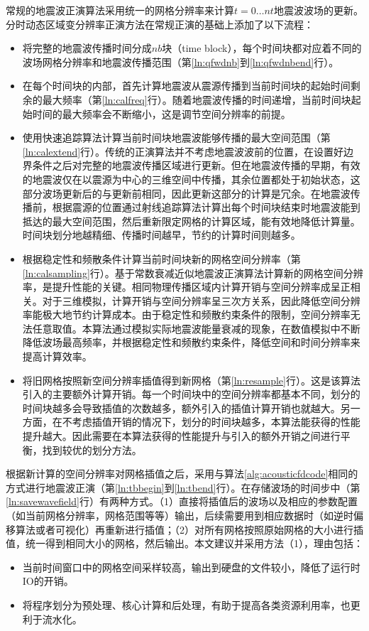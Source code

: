 常规的地震波正演算法采用统一的网格分辨率来计算$t=0\ldots nt$地震波波场的更新。分时动态区域变分辨率正演方法在常规正演的基础上添加了以下流程：
\begin{itemize}
  \item 将完整的地震波传播时间分成$nb$块（time block），每个时间块都对应着不同的波场网格分辨率和地震波传播范围（第\ref{ln:qfwdnb}到\ref{ln:qfwdnbend}行）。
  \item 在每个时间块的内部，首先计算地震波从震源传播到当前时间块的起始时间剩余的最大频率（第\ref{ln:calfreq}行）。随着地震波传播的时间递增，当前时间块起始时间的最大频率会不断缩小，这是调节空间分辨率的前提。
  \item 使用快速追踪算法\cite{um1987fast}计算当前时间块地震波能够传播的最大空间范围（第\ref{ln:calextend}行）。传统的正演算法并不考虑地震波波前的位置，在设置好边界条件之后对完整的地震波传播区域进行更新。但在地震波传播的早期，有效的地震波仅在以震源为中心的三维空间中传播，其余位置都处于初始状态，这部分波场更新后的与更新前相同，因此更新这部分的计算是冗余。在地震波传播前，根据震源的位置通过射线追踪算法计算出每个时间块结束时地震波能到抵达的最大空间范围，然后重新限定网格的计算区域，能有效地降低计算量。时间块划分地越精细、传播时间越早，节约的计算时间则越多。
  \item 根据稳定性和频散条件计算当前时间块新的网格空间分辨率（第\ref{ln:calsampling}行）。基于常数衰减近似地震波正演算法计算新的网格空间分辨率，是提升性能的关键。相同物理传播区域内计算开销与空间分辨率成呈正相关。对于三维模拟，计算开销与空间分辨率呈三次方关系，因此降低空间分辨率能极大地节约计算成本。由于稳定性和频散约束条件的限制，空间分辨率无法任意取值。本算法通过模拟实际地震波能量衰减的现象，在数值模拟中不断降低波场最高频率，并根据稳定性和频散约束条件，降低空间和时间分辨率来提高计算效率。
  \item 将旧网格按照新空间分辨率插值得到新网格（第\ref{ln:resample}行）。这是该算法引入的主要额外计算开销。每一个时间块中的空间分辨率都基本不同，划分的时间块越多会导致插值的次数越多，额外引入的插值计算开销也就越大。另一方面，在不考虑插值开销的情况下，划分的时间块越多，本算法能获得的性能提升越大。因此需要在本算法获得的性能提升与引入的额外开销之间进行平衡，找到较优的划分方法。
\end{itemize}

根据新计算的空间分辨率对网格插值之后，采用与算法\ref{alg:acousticfdcode}相同的方式进行地震波正演（第\ref{ln:tbbegin}到\ref{ln:tbend}行）。在存储波场的时间步中（第\ref{ln:savewavefield}行）有两种方式。（1）直接将插值后的波场以及相应的参数配置（如当前网格分辨率，网格范围等等）输出，后续需要用到相应数据时（如逆时偏移算法或者可视化）再重新进行插值；（2）对所有网格按照原始网格的大小进行插值，统一得到相同大小的网格，然后输出。本文建议并采用方法（1），理由包括：
\begin{itemize}
  \item 当前时间窗口中的网格空间采样较高，输出到硬盘的文件较小，降低了运行时IO的开销。
  \item 将程序划分为预处理、核心计算和后处理，有助于提高各类资源利用率，也更利于流水化。
\end{itemize}

